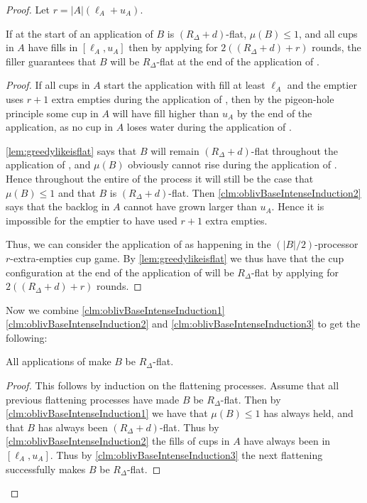 \begin{proof}
Let $r = |A|(\ell_A + u_A)$.
\begin{clm}
  \label{clm:oblivBaseIntenseInduction3}
  If at the start of an application of \flatalg $B$ is $(R_\Delta
  + d)$-flat, $\mu(B) \le 1$, and all cups in $A$ have fills in
  $[\ell_A, u_A]$ then by applying \flatalg for $2((R_\Delta + d)
  + r)$ rounds, the filler guarantees that $B$ will be
  $R_\Delta$-flat at the end of the application of \flatalg. 
\end{clm}
\begin{proof}
  If all cups in $A$ start the application with fill at
  least $\ell_A$ and the emptier uses $r+1$ extra
  empties during the application of \flatalg, then by the
  pigeon-hole principle some cup in $A$
  will have fill higher than $u_A$ by the end of the application,
  as no cup in $A$ loses water during the application of \flatalg.
  
  \cref{lem:greedylikeisflat} says that $B$ will remain
  $(R_\Delta + d)$-flat throughout the application of \flatalg,
  and $\mu(B)$ obviously cannot rise during the application of
  \flatalg. Hence throughout the entire of the process it will still be the
  case that $\mu(B) \le 1$ and that $B$ is $(R_\Delta + d)$-flat.
  Then \cref{clm:oblivBaseIntenseInduction2} says that the
  backlog in $A$ cannot have grown larger than $u_A$. Hence it is
  impossible for the emptier to have used $r+1$ extra empties.

  Thus, we can consider the application of \flatalg as happening
  in the $(|B|/2)$-processor $r$-extra-empties cup game. By
  \cref{lem:greedylikeisflat} we thus have that the cup
  configuration at the end of the application of \flatalg will be
  $R_\Delta$-flat by applying \flatalg for $2((R_\Delta + d) +
  r)$ rounds.
\end{proof}

Now we combine \cref{clm:oblivBaseIntenseInduction1}
\cref{clm:oblivBaseIntenseInduction2} and
\cref{clm:oblivBaseIntenseInduction3} to get the following:
\begin{clm}
  \label{clm:flatteningAlwaysWorks}
  All applications of \flatalg make $B$ be $R_\Delta$-flat.
 \end{clm}
\begin{proof}
  This follows by induction on the flattening processes. Assume
  that all previous flattening processes have made $B$ be
  $R_\Delta$-flat. Then by
  \cref{clm:oblivBaseIntenseInduction1} we have that $\mu(B) \le
  1$ has always held, and that $B$ has always been $(R_\Delta +
  d)$-flat. Thus by \cref{clm:oblivBaseIntenseInduction2} the
  fills of cups in $A$ have always been in $[\ell_A, u_A]$. Thus
  by \cref{clm:oblivBaseIntenseInduction3} the next flattening
  successfully makes $B$ be $R_\Delta$-flat.


\end{proof}
\end{proof}
